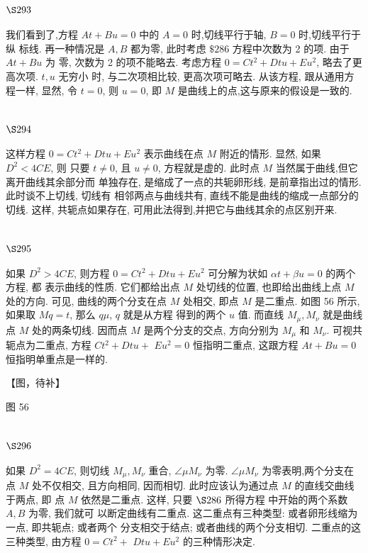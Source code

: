 \section{$\S 293$}

我们看到了,方程 $A t+B u=0$ 中的 $A=0$ 时,切线平行于轴, $B=0$ 时,切线平行于纵 标线. 再一种情况是 $A, B$ 都为零, 此时考虑 $\$ 286$ 方程中次数为 2 的项. 由于 $A t+B u$ 为 零, 次数为 2 的项不能略去. 考虑方程 $0=C t^{2}+D t u+E u^{2}$, 略去了更高次项. $t, u$ 无穷小 时, 与二次项相比较, 更高次项可略去. 从该方程, 跟从通用方程一样, 显然, 令 $t=0$, 则 $u=0$, 即 $M$ 是曲线上的点,这与原来的假设是一致的.

\section{$\S 294$}

这样方程 $0=C t^{2}+D t u+E u^{2}$ 表示曲线在点 $M$ 附近的情形. 显然, 如果 $D^{2}<4 C E$, 则 只要 $t \neq 0$, 且 $u \neq 0$, 方程就是虚的. 此时点 $M$ 当然属于曲线,但它离开曲线其余部分而 单独存在, 是缩成了一点的共轭卵形线, 是前章指出过的情形. 此时谈不上切线, 切线有 相邻两点与曲线共有, 直线不能是曲线的缩成一点部分的切线. 这样, 共轭点如果存在, 可用此法得到,并把它与曲线其余的点区别开来.

\section{$\S 295$}

如果 $D^{2}>4 C E$, 则方程 $0=C t^{2}+D t u+E u^{2}$ 可分解为状如 $\alpha t+\beta u=0$ 的两个方程, 都 表示曲线的性质. 它们都给出点 $M$ 处切线的位置, 也即给出曲线上点 $M$ 处的方向. 可见, 曲线的两个分支在点 $M$ 处相交, 即点 $M$ 是二重点. 如图 56 所示, 如果取 $M q=t$, 那么 $q \mu$, $q$ 就是从方程 得到的两个 $u$ 值. 而直线 $M_{\mu}, M_{\nu}$ 就是曲线点 $M$ 处的两条切线. 因而点 $M$ 是两个分支的交点, 方向分别为 $M_{\mu}$ 和 $M_{\nu}$. 可视共轭点为二重点, 方程 $C t^{2}+D t u+$ $E u^{2}=0$ 恒指明二重点, 这跟方程 $A t+B u=0$ 恒指明单重点是一样的.


【图，待补】

图 56

\section{$\S 296$}

如果 $D^{2}=4 C E$, 则切线 $M_{\mu}, M_{\nu}$ 重合, $\angle \mu M_{\nu}$ 为零. $\angle \mu M_{\nu}$ 为零表明,两个分支在点 $M$ 处不仅相交, 且方向相同, 因而相切. 此时应该认为通过点 $M$ 的直线交曲线于两点, 即 点 $M$ 依然是二重点. 这样, 只要 $\S 286$ 所得方程 中开始的两个系数 $A, B$ 为零, 我们就可 以断定曲线有二重点. 这二重点有三种类型: 或者卵形线缩为一点, 即共轭点; 或者两个 分支相交于结点; 或者曲线的两个分支相切. 二重点的这三种类型, 由方程 $0=C t^{2}+$ $D t u+E u^{2}$ 的三种情形决定.

